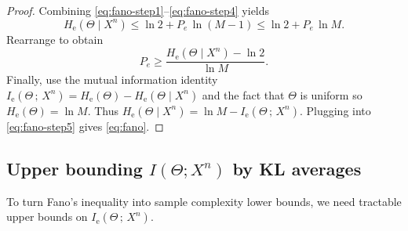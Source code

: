 \documentclass{article}
\numberwithin{equation}{section}
\newcommand{\MInat}[2]{I_{\mathrm{e}}\!\left(#1\,;\,#2\right)}
\begin{document}
\begin{proof}
Combining \eqref{eq:fano-step1}--\eqref{eq:fano-step4} yields
\begin{equation}
    H_{\mathrm{e}}(\Theta\mid X^n)
    \le \ln 2 + P_e\,\ln(M-1)
    \le \ln 2 + P_e\,\ln M.
\end{equation}
Rearrange to obtain
\begin{equation}
\label{eq:fano-step5}
    P_e \ge \frac{H_{\mathrm{e}}(\Theta\mid X^n) - \ln 2}{\ln M}.
\end{equation}
Finally, use the mutual information identity
\(\MInat{\Theta}{X^n} = H_{\mathrm{e}}(\Theta) - H_{\mathrm{e}}(\Theta\mid X^n)\)
and the fact that $\Theta$ is uniform so $H_{\mathrm{e}}(\Theta)=\ln M$.
Thus $H_{\mathrm{e}}(\Theta\mid X^n)=\ln M-\MInat{\Theta}{X^n}$.
Plugging into \eqref{eq:fano-step5} gives \eqref{eq:fano}.
\end{proof}

\subsection{Upper bounding $I(\Theta;X^n)$ by KL averages}

To turn Fano's inequality into sample complexity lower bounds, we need tractable upper bounds on $\MInat{\Theta}{X^n}$.
\end{document}
